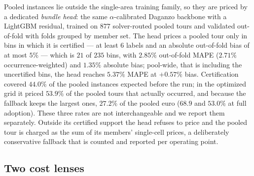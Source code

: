 \documentclass[preprint,12pt,authoryear]{elsarticle}
\begin{document}
Pooled instances lie outside the single-area training family, so they are priced by a dedicated \emph{bundle head}: the same $\alpha$-calibrated Daganzo backbone with a LightGBM residual, trained on $877$ solver-routed pooled tours and validated out-of-fold with folds grouped by member set. The head prices a pooled tour only in bins in which it is certified --- at least $6$ labels and an absolute out-of-fold bias of at most $5\%$ --- which is $21$ of $235$ bins, with $2.85\%$ out-of-fold MAPE ($2.71\%$ occurrence-weighted) and $1.35\%$ absolute bias; pool-wide, that is including the uncertified bins, the head reaches $5.37\%$ MAPE at $+0.57\%$ bias. Certification covered $44.0\%$ of the pooled instances expected before the run; in the optimized grid it priced $53.9\%$ of the pooled tours that actually occurred, and because the fallback keeps the largest ones, $27.2\%$ of the pooled euro ($68.9$ and $53.0\%$ at full adoption). These three rates are not interchangeable and we report them separately. Outside its certified support the head refuses to price and the pooled tour is charged as the sum of its members' single-cell prices, a deliberately conservative fallback that is counted and reported per operating point.






\subsection{Two cost lenses}
\label{sec:lenses}
\end{document}
